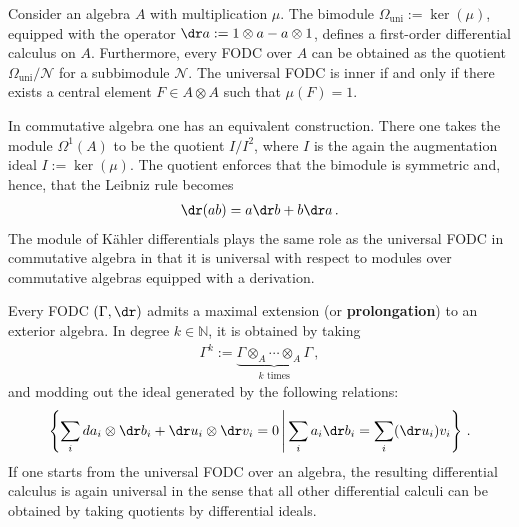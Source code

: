     \begin{example}
        Consider an algebra $A$ with multiplication $\mu$. The bimodule $\Omega_\text{uni}:=\ker(\mu)$, equipped with the operator $\dr a:=1\otimes a-a\otimes1$, defines a first-order differential calculus on $A$. Furthermore, every FODC over $A$ can be obtained as the quotient $\Omega_\text{uni}/\mathcal{N}$ for a subbimodule $\mathcal{N}$. The universal FODC is inner if and only if there exists a central element $F\in A\otimes A$ such that $\mu(F)=1$.
    \end{example}
    \begin{example}
        In commutative algebra one has an equivalent construction. There one takes the module $\Omega^1(A)$ to be the quotient $I/I^2$, where $I$ is the again the augmentation ideal $I:=\ker(\mu)$. The quotient enforces that the bimodule is symmetric and, hence, that the Leibniz rule becomes
        \begin{gather}
            \dr(ab) = a\dr b + b\dr a\,.
        \end{gather}
        The module of K\"ahler differentials plays the same role as the universal FODC in commutative algebra in that it is universal with respect to modules over commutative algebras equipped with a derivation.
    \end{example}


    \begin{property}[Prolongation]\label{nca:prolongation}
        Every FODC $(\Gamma,\dr)$ admits a maximal extension (or \textbf{prolongation}) to an exterior algebra. In degree $k\in\mathbb{N}$, it is obtained by taking
        \begin{gather}
            \Gamma^k := \underbrace{\Gamma\otimes_A\cdots\otimes_A\Gamma}_{k\text{ times}}\,,
        \end{gather}
        and modding out the ideal generated by the following relations:
        \begin{gather}
            \left\{\sum_ida_i\otimes\dr b_i+\dr u_i\otimes\dr v_i=0\,\middle\vert\,\sum_ia_i\dr b_i=\sum_i(\dr u_i)v_i\right\}\,.
        \end{gather}
        If one starts from the universal FODC over an algebra, the resulting differential calculus is again universal in the sense that all other differential calculi can be obtained by taking quotients by differential ideals.
    \end{property}

